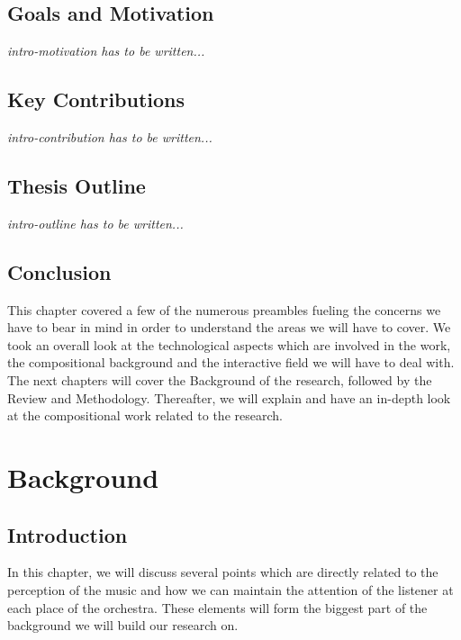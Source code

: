 \documentclass[letterpaper, openright]{report}
\begin{document}
            
    
    \section{Goals and Motivation} %
	\label{sub:intro-motivation}
\textit{intro-motivation has to be written...}
    
    \section{Key Contributions} %
	\label{sub:intro-contribution}
\textit{intro-contribution has to be written...}

    \section{Thesis Outline} %
	\label{sub:intro-outline}
\textit{intro-outline has to be written...}

    \section{Conclusion} %
	\label{sub:intro-conclusion}
This chapter covered a few of the numerous preambles fueling the concerns we have to bear in mind in order to understand the areas we will have to cover. We took an overall look at the technological aspects which are involved in the work, the compositional background and the interactive field we will have to deal with. \newline
The next chapters will cover the Background of the research, followed by the Review and Methodology. Thereafter, we will explain and have an in-depth look at the compositional work related to the research.
    

	\vspace{0.5cm}


\newpage
	\newpage
\chapter{Background} %
\label{sec:background}

	\section{Introduction} %
	\label{sub:back-intro}
In this chapter, we will discuss several points which are directly related to the perception of the music and how we can maintain the attention of the listener at each place of the orchestra. These elements will form the biggest part of the background we will build our research on.
    
\end{document}
